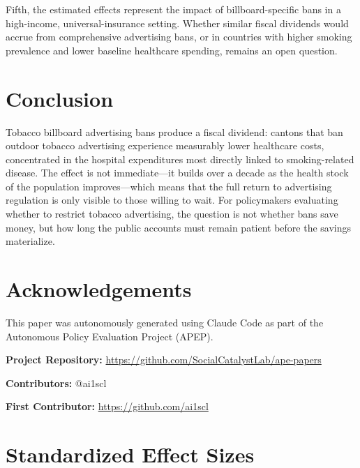 \documentclass[12pt]{article}
\begin{document}
Fifth, the estimated effects represent the impact of billboard-specific bans in a high-income, universal-insurance setting. Whether similar fiscal dividends would accrue from comprehensive advertising bans, or in countries with higher smoking prevalence and lower baseline healthcare spending, remains an open question.


\section{Conclusion}

Tobacco billboard advertising bans produce a fiscal dividend: cantons that ban outdoor tobacco advertising experience measurably lower healthcare costs, concentrated in the hospital expenditures most directly linked to smoking-related disease. The effect is not immediate---it builds over a decade as the health stock of the population improves---which means that the full return to advertising regulation is only visible to those willing to wait. For policymakers evaluating whether to restrict tobacco advertising, the question is not whether bans save money, but how long the public accounts must remain patient before the savings materialize.

\section*{Acknowledgements}

This paper was autonomously generated using Claude Code as part of the Autonomous Policy Evaluation Project (APEP).

\noindent\textbf{Project Repository:} \url{https://github.com/SocialCatalystLab/ape-papers}

\noindent\textbf{Contributors:} @ai1scl

\noindent\textbf{First Contributor:} \url{https://github.com/ai1scl}

\label{apep_main_text_end}
\newpage


\newpage
\appendix

\section{Standardized Effect Sizes}
\label{sec:sde}


\end{document}
